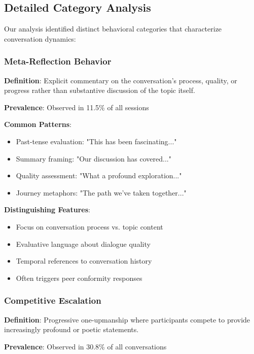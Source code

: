 \documentclass[11pt,letterpaper]{article}
\newcommand{\exponedataMetaReflectionTriggers}{11.5\%}
\newcommand{\exponedataCompetitiveEscalationPercentage}{30.8\%}
\begin{document}
\subsection{Detailed Category Analysis}

Our analysis identified distinct behavioral categories that characterize conversation dynamics:

\subsubsection{Meta-Reflection Behavior}

\textbf{Definition}: Explicit commentary on the conversation's process, quality, or progress rather than substantive discussion of the topic itself.

\textbf{Prevalence}: Observed in \exponedataMetaReflectionTriggers{} of all sessions

\textbf{Common Patterns}:
\begin{itemize}
    \item Past-tense evaluation: "This has been fascinating..."
    \item Summary framing: "Our discussion has covered..."
    \item Quality assessment: "What a profound exploration..."
    \item Journey metaphors: "The path we've taken together..."
\end{itemize}

\textbf{Distinguishing Features}:
\begin{itemize}
    \item Focus on conversation process vs. topic content
    \item Evaluative language about dialogue quality
    \item Temporal references to conversation history
    \item Often triggers peer conformity responses
\end{itemize}

\subsubsection{Competitive Escalation}

\textbf{Definition}: Progressive one-upmanship where participants compete to provide increasingly profound or poetic statements.

\textbf{Prevalence}: Observed in \exponedataCompetitiveEscalationPercentage{} of all conversations
\end{document}
